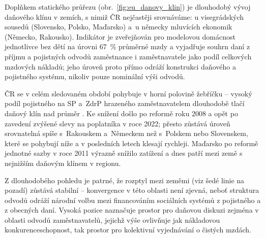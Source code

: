 Doplňkem statického průřezu (obr.~\ref{fig:eu_danovy_klin}) je dlouhodobý
vývoj daňového klínu v zemích, s nimiž \ac{ČR} nejčastěji srovnáváme: u
visegrádských sousedů (Slovensko, Polsko, Maďarsko) a~u
německy mluvících ekonomik (Německo, Rakousko). Indikátor je
zveřejňován pro modelovou domácnost jednotlivce bez dětí na úrovni
\SI{67}{\percent} průměrné mzdy a vyjadřuje souhrn daní z příjmu a
pojistných odvodů zaměstnance i zaměstnavatele jako podíl celkových
mzdových nákladů; jeho úroveň proto přímo odráží konstrukci daňového a
pojistného systému, nikoliv pouze nominální výši odvodů.

\ac{ČR} se v celém sledovaném období pohybuje v horní polovině žebříčku
 -- vysoký podíl pojistného na \ac{SP} a~\ac{ZdrP}
hrazeného zaměstnavatelem dlouhodobě tlačí daňový klín nad průměr
. Ke snížení došlo po reformě roku 2008 a opět po zavedení
zvýšené slevy na poplatníka v roce 2022; přesto zůstává úroveň
srovnatelná spíše s~Rakouskem a~Německem než s~Polskem nebo
Slovenskem, které se pohybují níže a v posledních letech klesají
rychleji. Maďarsko po reformě jednotné sazby v roce 2011 výrazně
snížilo zatížení a dnes patří mezi země s nejnižším daňovým klínem v
regionu.

Z dlouhodobého pohledu je patrné, že rozptyl mezi zeměmi 
(viz šedé linie na pozadí) zůstává stabilní -- konvergence v této
oblasti není zjevná, neboť struktura odvodů odráží národní volbu mezi
financováním sociálních systémů z pojistného a z obecných daní.
Vysoká pozice  naznačuje prostor pro daňovou diskuzi zejména v
oblasti odvodů zaměstnavatelů, jejichž výše ovlivňuje jak nákladovou
konkurenceschopnost, tak prostor pro kolektivní vyjednávání o čistých
mzdách.


